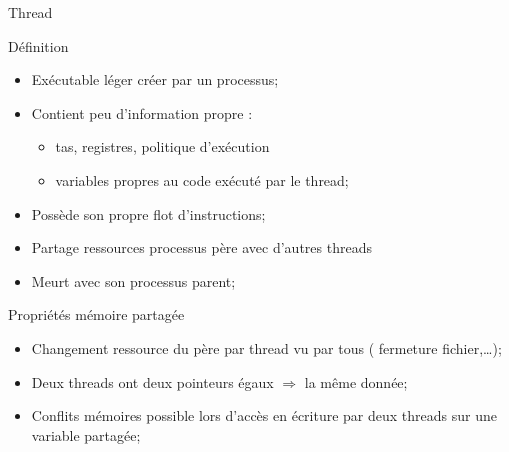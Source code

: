 \documentclass[handout,francais]{beamer}
\begin{document}
\begin{frame}{Thread}

{\scriptsize
\begin{block}{Définition}
\begin{itemize}
\item Exécutable léger créer par un processus;
\item Contient peu d'information propre :
\begin{itemize}
\item tas, registres, politique d'exécution
\item variables propres au code exécuté par le thread;
\end{itemize}
\item Possède son propre flot d'instructions;
\item Partage ressources processus père avec d'autres threads
\item Meurt avec son processus parent;
\end{itemize}
\end{block}

\begin{block}{Propriétés mémoire partagée}
\begin{itemize}
\item Changement ressource du père par thread vu par tous ( fermeture fichier,\ldots );
\item Deux threads ont deux pointeurs égaux $\Rightarrow$  la même donnée;
\item Conflits mémoires possible lors d'accès en écriture par deux threads sur une variable partagée;
\end{itemize}
\end{block}
}
\end{frame}
\end{document}
